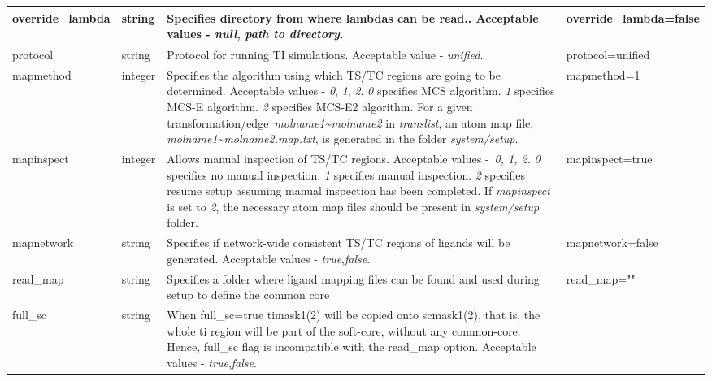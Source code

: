 \documentclass[11pt,letterpaper,titlepage]{article}
\begin{document}
\begin{footnotesize}
\begin{landscape}
\begin{center}
\begin{longtable}[1]{p{3cm}|p{0.5cm}|p{11cm}|p{4cm}}
\hline
override\_lambda	& string          & Specifies directory from where lambdas can be read.. Acceptable values - \textit{null}, \textit{path to directory}.   & override\_lambda=false   \\
\hline
protocol           & string          & Protocol for running TI simulations. Acceptable value - \textit{unified}.     & protocol=unified     \\ 
\hline
	mapmethod          & integer         & Specifies the algorithm using which TS/TC regions are going to be determined. Acceptable values - \textit{0}, \textit{1}, \textit{2}. \newline \textit{0} specifies MCS algorithm. \newline \textit{1} specifies MCS-E algorithm. \newline \textit{2} specifies MCS-E2 algorithm. \newline For a given transformation/edge~\textit{molname1\textasciitilde{}molname2} in \textit{translist}, an atom map file, \textit{molname1\textasciitilde{}molname2.map.txt}, is generated in the folder \textit{system/setup}.   & mapmethod=1      \\ 
\hline
	mapinspect         & integer         & Allows manual inspection of TS/TC regions. Acceptable values -~\textit{0, 1, 2.} \newline \textit{0} specifies no manual inspection. \newline\textit{1} specifies manual inspection. \newline \textit{2} specifies resume setup assuming manual inspection has been completed. \newline If \textit{mapinspect} is set to \textit{2}, the necessary atom map files should be present in \textit{system/setup} folder. & mapinspect=true \\
\hline
mapnetwork         & string          & Specifies if network-wide consistent TS/TC regions of ligands will be generated. Acceptable values - \textit{true},\textit{false}.    & mapnetwork=false     \\ 
\hline
read\_map  		   & string 	     & Specifies a folder where ligand mapping files can be found and used during setup to define the common core    & read\_map="" \\
\hline
full\_sc           & string          & When full\_sc=true timask1(2) will be copied onto scmask1(2), that is, the whole ti region will be part of the soft-core, without any common-core. Hence, full\_sc flag is incompatible with the read\_map option. Acceptable values - \textit{true},\textit{false}. \\

\end{longtable}
\end{center}
\end{landscape}
\end{footnotesize}
\end{document}
